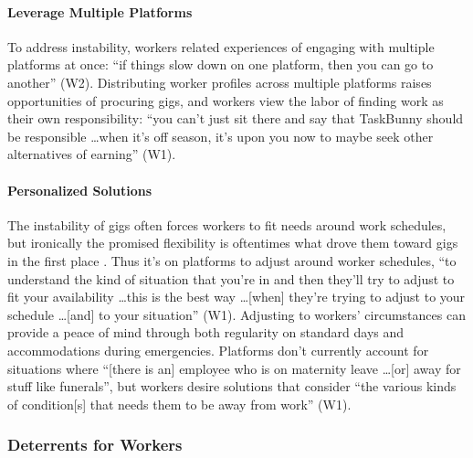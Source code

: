 \paragraph{Leverage Multiple Platforms} \label{multiapp}
To address instability, workers related experiences of engaging with multiple platforms at once: ``if things slow down on one platform, then you can go to another'' (W2). Distributing worker profiles across multiple platforms raises opportunities of procuring gigs, and workers view the labor of finding work as their own responsibility: ``you can't just sit there and say that TaskBunny should be responsible \dots when it's off season, it's upon you now to maybe seek other alternatives of earning'' (W1).

\paragraph{Personalized Solutions} \label{personalized}
The instability of gigs often forces workers to fit needs around work schedules, but ironically the promised flexibility is oftentimes what drove them toward gigs in the first place \cite{lee2015working}. Thus it's on platforms to adjust around worker schedules, ``to understand the kind of situation that you're in and then they'll try to adjust to fit your availability \dots this is the best way \dots [when] they're trying to adjust to your schedule \dots [and] to your situation'' (W1). Adjusting to workers' circumstances can provide a peace of mind through both regularity on standard days and accommodations during emergencies. Platforms don't currently account for situations where ``[there is an] employee who is on maternity leave \dots [or] away for stuff like funerals'', but workers desire solutions that consider ``the various kinds of condition[s] that needs them to be away from work'' (W1).

\subsubsection{Deterrents for Workers}
